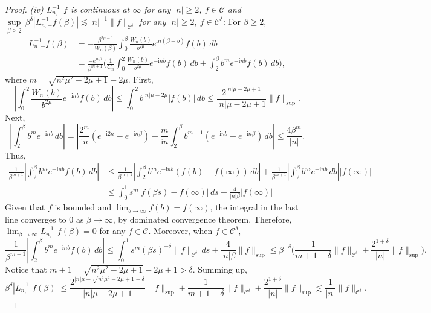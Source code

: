 \documentclass[10pt,a4paper]{amsart}
\newcommand{\abs}[1]{\left\lvert #1 \right\rvert}
\newcommand{\mcal}{\mathcal}
\newcommand{\norm}[1]{\lVert #1 \rVert}
\begin{document}
\begin{proof}
\noindent\textit{(iv) $L_{n,-}^{-1} f$ is continuous at $\infty$ for any $|n|\geq 2$, $f\in \mcal{C}$ and $\underset{\beta \geq 2}{\sup} \,\beta^\delta |L_{n,-}^{-1} f(\beta)| \lesssim |n|^{-1} \norm{f}_{\mcal{C}^\delta}$ for any $|n|\geq 2$, $f\in \mcal{C}^\delta$}: For $\beta \geq 2$,
\begin{align*}
L_{n,-}^{-1} f(\beta) &= - \frac{\beta^{2\mu - 1}}{W_n(\beta)} \int_0^\beta \frac{W_n(b)}{b^{2\mu}} e^{\textrm{i}n(\beta - b)} f(b) \,db \\
&= \frac{-e^{\textrm{i}n \beta}}{\beta^{m + 1}} \bigg( \frac{1}{C_n} \int_0^2 \frac{W_n(b)}{b^{2\mu}} e^{-\textrm{i}n b} f(b) \,db + \int_2^\beta b^{m} e^{-\textrm{i}n b} f(b) \,db \bigg),
\end{align*}
where $m = \sqrt{n^2\mu^2 - 2\mu + 1} - 2\mu$. First,
\[\abs{\int_0^2 \frac{W_n(b)}{b^{2\mu}} e^{-\textrm{i}n b} f(b) \,db} \leq \int_0^2 b^{|n|\mu - 2\mu} |f(b)| \,db \leq \frac{2^{|n|\mu - 2\mu + 1}}{|n|\mu - 2\mu + 1} \norm{f}_{\sup}.\]
Next,
\[ \abs{\int_2^\beta b^m e^{-\textrm{i}n b} \,db} = \abs{\frac{2^m}{\textrm{i}n}(e^{-\textrm{i}2n} - e^{-\textrm{i}n\beta}) +\frac{m}{\textrm{i}n} \int_2^\beta b^{m-1} (e^{-\textrm{i}n b} - e^{-\textrm{i}n\beta}) \, db} \leq \frac{4\beta^m}{|n|}.\]
Thus,
\begin{align*}
\frac{1}{\beta^{m+1}} \abs{\int_2^\beta b^m e^{-\textrm{i}n b} f(b) \,db} &\leq \frac{1}{\beta^{m+1}} \abs{\int_2^\beta b^m e^{-\textrm{i}n b} (f(b) - f(\infty)) \,db} + \frac{1}{\beta^{m+1}} \abs{\int_2^\beta b^m e^{-\textrm{i}n b} \,db} |f(\infty)| \\
& \leq \int_{0}^1 s^m |f(\beta s) - f(\infty)| \,ds + \frac{4}{|n| \beta} |f(\infty)|
\end{align*}
Given that $f$ is bounded and $\displaystyle \lim_{b\to \infty} f(b) = f(\infty)$, the integral in the last line converges to $0$ as $\beta \to \infty$, by dominated convergence theorem. Therefore, $\displaystyle\lim_{\beta \to \infty} L^{-1}_{n,-} f(\beta) = 0$ for any $f\in \mcal{C}$. Moreover, when $f\in \mcal{C}^\delta$,
\[ \frac{1}{\beta^{m+1}} \abs{\int_2^\beta b^m e^{-\textrm{i}n b} f(b) \,db} \leq \int_0^1 s^m (\beta s)^{-\delta} \norm{f}_{\mcal{C}^\delta} \,ds + \frac{4}{|n|\beta} \norm{f}_{\sup} \leq \beta^{-\delta} \bigg( \frac{1}{m+1-\delta} \norm{f}_{\mcal{C}^\delta} + \frac{2^{1+\delta}}{|n|} \norm{f}_{\sup} \bigg).\]
Notice that $m+1 = \sqrt{n^2 \mu^2 - 2\mu + 1} - 2\mu + 1 > \delta$. Summing up,
\[ \beta^\delta |L_{n,-}^{-1} f(\beta)| \leq \frac{2^{|n|\mu - \sqrt{n^2\mu^2 - 2\mu + 1}+\delta}}{|n|\mu - 2\mu + 1} \norm{f}_{\sup} + \frac{1}{m+1-\delta} \norm{f}_{\mcal{C}^\delta} + \frac{2^{1+\delta}}{|n|} \norm{f}_{\sup} \lesssim \frac{1}{|n|} \norm{f}_{\mcal{C}^\delta}.\]

\end{proof}
\end{document}

